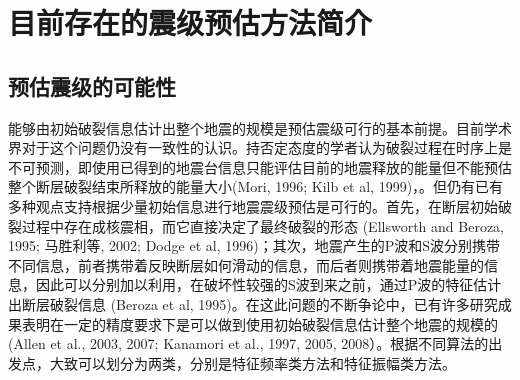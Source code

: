 
\chapter{目前存在的震级预估方法简介}

\section{预估震级的可能性}

\indent 能够由初始破裂信息估计出整个地震的规模是预估震级可行的基本前提。目前学术界对于这个问题仍没有一致性的认识。持否定态度的学者认为破裂过程在时序上是不可预测，即使用已得到的地震台信息只能评估目前的地震释放的能量但不能预估整个断层破裂结束所释放的能量大小(Mori, 1996; Kilb et al, 1999)，。但仍有已有多种观点支持根据少量初始信息进行地震震级预估是可行的。首先，在断层初始破裂过程中存在成核震相，而它直接决定了最终破裂的形态 (Ellsworth and Beroza, 1995; 马胜利等, 2002; Dodge et al, 1996)；其次，地震产生的P波和S波分别携带不同信息，前者携带着反映断层如何滑动的信息，而后者则携带着地震能量的信息，因此可以分别加以利用，在破坏性较强的S波到来之前，通过P波的特征估计出断层破裂信息 (Beroza et al, 1995)。在这此问题的不断争论中，已有许多研究成果表明在一定的精度要求下是可以做到使用初始破裂信息估计整个地震的规模的 (Allen et al., 2003, 2007; Kanamori et al., 1997, 2005, 2008）。根据不同算法的出发点，大致可以划分为两类，分别是特征频率类方法和特征振幅类方法。\\

